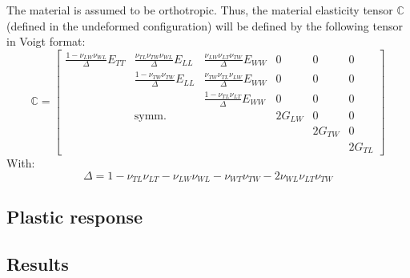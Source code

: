 The material is assumed to be orthotropic. Thus, the material elasticity tensor $\boldsymbol{\mathbb C}$ (defined in the undeformed configuration) will be defined by the following tensor in Voigt format:
\begin{equation}
\boldsymbol{\mathbb C}=\begin{bmatrix}
\frac{1-\nu_{LW}\nu_{WL}}{\Delta}E_{TT} & \frac{\nu_{TL}\nu_{TW}\nu_{WL}}{\Delta}E_{LL} & \frac{\nu_{LW}\nu_{LT}\nu_{TW}}{\Delta}E_{WW} & 0 & 0 & 0\\ 
 & \frac{1-\nu_{TW}\nu_{TW}}{\Delta}E_{LL} & \frac{\nu_{TW}\nu_{TL}\nu_{LW}}{\Delta}E_{WW} & 0 & 0 & 0\\ 
 &  & \frac{1-\nu_{TL}\nu_{LT}}{\Delta}E_{WW} & 0 & 0 & 0 \\ 
 & \text{symm.} &  & 2G_{LW} & 0 & 0\\ 
 &  &   &  & 2G_{TW} & 0\\ 
 &  &  &  &  & 2G_{TL}
\end{bmatrix}
\end{equation} 
With:
\begin{equation}
    \Delta = 1-\nu_{TL}\nu_{LT}-\nu_{LW}\nu_{WL}-\nu_{WT}\nu_{TW}-2\nu_{WL}\nu_{LT}\nu_{TW}
\end{equation}



\subsection{Plastic response}
\subsection{Results}